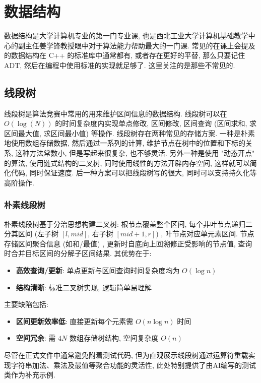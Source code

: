 \documentclass[a4paper]{ctexart}
\begin{document}
\section{数据结构}

数据结构是大学计算机专业的第一门专业课, 也是西北工业大学计算机基础教学中心的副主任姜学锋教授眼中对于算法能力帮助最大的一门课. 常见的在课上会提及的数据结构在 C++ 的标准库中通常都有, 或者存在更好的平替, 那么只要记住 ADT, 然后在编程中使用标准的实现就足够了. 这里关注的是那些不常见的.

\subsection{线段树}

线段树是算法竞赛中常用的用来维护区间信息的数据结构. 线段树可以在 $O(\log(N))$ 的时间复杂度内实现单点修改, 区间修改, 区间查询 (区间求和, 求区间最大值, 求区间最小值) 等操作. 线段树存在两种常见的存储方案. 一种是朴素地使用数组存储数据, 然后通过一系列的计算, 维护节点在树中的位置和下标的关系, 这种方法常数小, 但是写起来很复杂, 也不够灵活. 另外一种是使用 "动态开点" 的算法, 使用链式结构的二叉树, 同时使用线性的方法开辟内存空间, 这样就可以简化代码, 同时保证速度. 后一种方案可以把线段树写的很大, 同时可以支持持久化等高阶操作.

\subsubsection*{朴素线段树}

朴素线段树基于分治思想构建二叉树: 根节点覆盖整个区间, 每个非叶节点递归二分其区间 (左子树 $[l, mid]$, 右子树 $[mid+1, r]$) , 叶节点对应单元素区间. 节点存储区间聚合信息 (如和/最值) , 更新时自底向上回溯修正受影响的节点值, 查询时合并目标区间的分解子区间结果. 其优势在于: 
\begin{itemize}
	\item \textbf{高效查询/更新}: 单点更新与区间查询时间复杂度均为 $O(\log n)$
	\item \textbf{结构清晰}: 标准二叉树实现, 逻辑简单易理解
\end{itemize}
主要缺陷包括: 
\begin{itemize}
	\item \textbf{区间更新效率低}: 直接更新每个元素需 $O(n \log n)$ 时间
	\item \textbf{空间冗余}: 需 $4N$ 数组存储树结构, 空间复杂度 $O(n)$
\end{itemize}

尽管在正式文件中通常避免附着测试代码, 但为直观展示线段树通过运算符重载实现字符串加法、乘法及最值等聚合功能的灵活性, 此处特别提供了由AI编写的测试类作为补充示例. 
\end{document}
